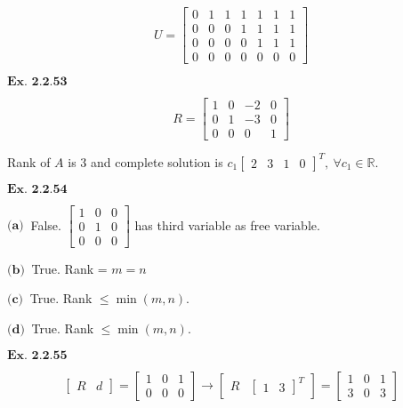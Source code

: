 \documentclass{article}
\begin{document}
$$
U = \begin{bmatrix}0&1&1&1&1&1&1\\0&0&0&1&1&1&1\\0&0&0&0&1&1&1\\0&0&0&0&0&0&0\end{bmatrix}
$$

\vspace{0.2in}
${\textbf{Ex. 2.2.53}}$

$$
R = \begin{bmatrix}1&0&-2&0\\0&1&-3&0\\0&0&0&1\end{bmatrix}
$$

Rank of $A$ is $3$ and complete solution is $c_1\begin{bmatrix}2&3&1&0\end{bmatrix}^T, \ \forall c_1 \in \mathbb{R}$.

\vspace{0.2in}
${\textbf{Ex. 2.2.54}}$

$\textbf{(a)} \ $ False. $\begin{bmatrix}1&0&0\\0&1&0\\0&0&0\end{bmatrix}$ has third variable as free variable.

$\textbf{(b)} \ $ True. Rank = $m = n$

$\textbf{(c)} \ $ True. Rank $\leq \min(m,n)$.

$\textbf{(d)} \ $ True. Rank $\leq \min(m,n)$.

\vspace{0.2in}
${\textbf{Ex. 2.2.55}}$

$$
\begin{bmatrix}R & d\end{bmatrix} = \begin{bmatrix}1 & 0 & 1 \\ 0 & 0 & 0\end{bmatrix} \rightarrow \begin{bmatrix}R & \begin{bmatrix}1 & 3\end{bmatrix}^T\end{bmatrix} = \begin{bmatrix}1 & 0 & 1 \\ 3 & 0 & 3\end{bmatrix}
$$
\end{document}

